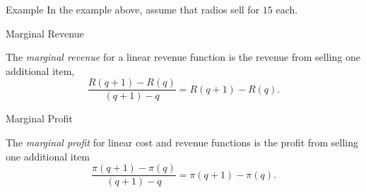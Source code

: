 \documentclass[Lecture.tex]{subfiles}
\begin{document}
\begin{frame}{Example}
  In the example above, assume that radios sell for $15$ each.
\end{frame}

\begin{frame}{Marginal Revenue}
  \begin{defn}
    The {\it marginal revenue} for a linear revenue function is the revenue from selling one additional item,
    $$\frac{R(q + 1) - R(q)}{(q + 1) - q} = R(q + 1) - R(q).$$
  \end{defn}
\end{frame}
    
\begin{frame}{Marginal Profit}
  \begin{defn}
    The {\it marginal profit} for linear cost and revenue functions is the profit from selling one additional item
    $$\frac{\pi(q+1) - \pi(q)}{(q + 1) - q} = \pi(q + 1) - \pi(q).$$
  \end{defn}
  
\end{frame}
\end{document}
